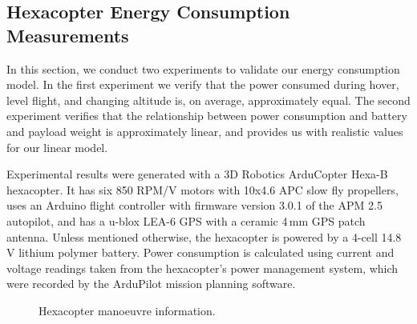 \documentclass[journal]{IEEEtran}
\begin{document}
\subsection{Hexacopter Energy Consumption Measurements}
\label{ssec:hexacopter-energy-consumption-measurements}

In this section, we conduct two experiments to validate our energy consumption model. In the first experiment we verify that the power consumed during hover, level flight, and changing altitude is, on average, approximately equal. The second experiment verifies that the relationship between power consumption and battery and payload weight is approximately linear, and provides us with realistic values for our linear model.

Experimental results were generated with a 3D Robotics ArduCopter Hexa-B hexacopter. It has six 850 RPM/V motors with 10x4.6 APC slow fly propellers, uses an Arduino flight controller with firmware version 3.0.1 of the APM 2.5 autopilot, and has a u-blox LEA-6 GPS with a ceramic 4\,mm GPS patch antenna. Unless mentioned otherwise, the hexacopter is powered by a 4-cell 14.8\,V lithium polymer battery. Power consumption is calculated using current and voltage readings taken from the hexacopter's power management system, which were recorded by the ArduPilot mission planning software.

\begin{figure}[t!]
\centering
{}
\hspace{20px}
		\caption{Hexacopter manoeuvre information.}
		\label{fig:manoeuvre-info}
\end{figure}
\end{document}
